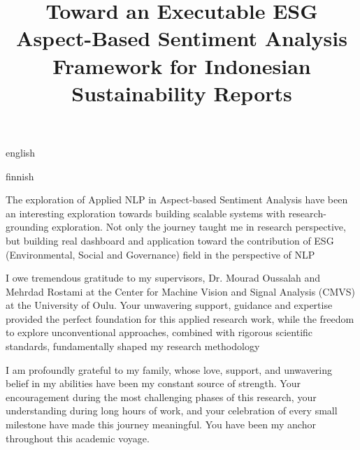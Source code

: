 \documentclass[english, online, cse, master]{dithesis}
\title{Toward an Executable ESG Aspect-Based Sentiment Analysis Framework for Indonesian Sustainability Reports}
\begin{document}
\pagestyle{empty}
\maketitlepage
\makecopyrightpage

 {

\begin{thesisabstract}{english}
  \abstractmetadata
\end{thesisabstract}
\begin{thesisabstract}{finnish}
\tiivistelmametadata
\end{thesisabstract}
}

\contents \thispagestyle{empty}
\header{\headerforeword}

The exploration of Applied NLP in Aspect-based Sentiment Analysis have been an interesting exploration towards building scalable systems with research-grounding exploration. Not only the journey taught me in research perspective, but building real dashboard and application toward the contribution of ESG (Environmental, Social and Governance) field in the perspective of NLP

I owe tremendous gratitude to my supervisors, Dr. Mourad Oussalah and Mehrdad Rostami at the Center for Machine Vision and Signal Analysis (CMVS) at the University of Oulu. Your unwavering support, guidance and expertise provided the perfect foundation for this applied research work, while the freedom to explore unconventional approaches, combined with rigorous scientific standards,
fundamentally shaped my research methodology

I am profoundly grateful to my family, whose love, support, and unwavering belief
in my abilities have been my constant source of strength. Your encouragement
during the most challenging phases of this research, your understanding during long
hours of work, and your celebration of every small milestone have made this journey
meaningful. You have been my anchor throughout this academic voyage.
\end{document}
